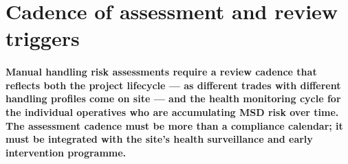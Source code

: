 \section{Cadence of assessment and review triggers}

\paragraph{Manual handling risk assessments require a review cadence that reflects both the project lifecycle --- as different trades with different handling profiles come on site --- and the health monitoring cycle for the individual operatives who are accumulating MSD risk over time. The assessment cadence must be more than a compliance calendar; it must be integrated with the site's health surveillance and early intervention programme.}

